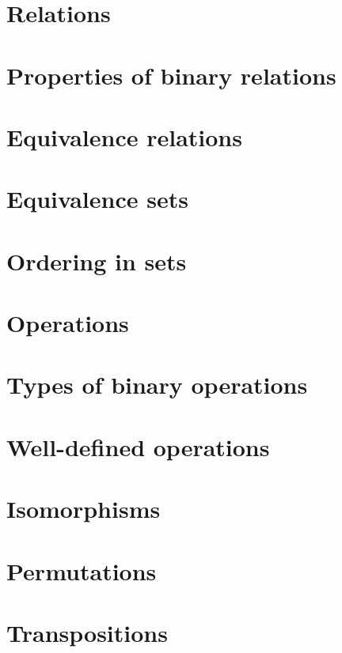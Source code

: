 \section{Relations}

\section{Properties of binary relations}

\section{Equivalence relations}

\section{Equivalence sets}

\section{Ordering in sets}


\section{Operations}

\section{Types of binary operations}

\section{Well-defined operations}

\section{Isomorphisms}

\section{Permutations}

\section{Transpositions}
